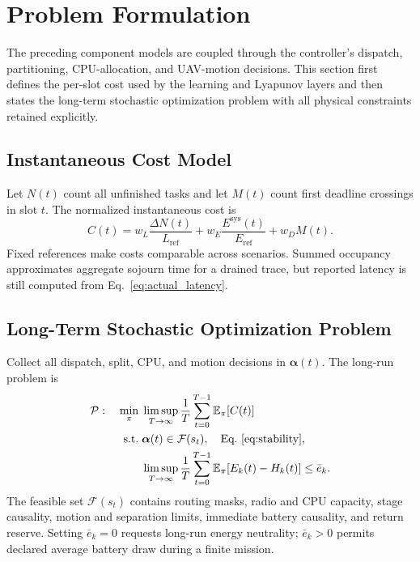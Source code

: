 \documentclass[journal]{IEEEtran}
\begin{document}
\section{Problem Formulation}
\label{problem_formulation}

The preceding component models are coupled through the controller's dispatch,
partitioning, CPU-allocation, and UAV-motion decisions.  This section first
defines the per-slot cost used by the learning and Lyapunov layers and then
states the long-term stochastic optimization problem with all physical
constraints retained explicitly.

\subsection{Instantaneous Cost Model}
Let $N(t)$ count all unfinished tasks and let $M(t)$ count first
deadline crossings in slot $t$.  The normalized instantaneous cost is
\begin{equation}
C(t)=w_L\frac{\Delta N(t)}{L_{\mathrm{ref}}}
+w_E\frac{E^{\mathrm{sys}}(t)}{E_{\mathrm{ref}}}
+w_DM(t).
\label{eq:cost}
\end{equation}
Fixed references make costs comparable across scenarios.  Summed
occupancy approximates aggregate sojourn time for a drained trace, but
reported latency is still computed from Eq.~\eqref{eq:actual_latency}.

\subsection{Long-Term Stochastic Optimization Problem}
Collect all dispatch, split, CPU, and motion decisions in
$\boldsymbol\alpha(t)$.  The long-run problem is
\begin{equation}
\begin{aligned}
\mathcal P:\quad \min_{\pi}\;&
\limsup_{T\to\infty}\frac1T
\sum_{t=0}^{T-1}\mathbb E_{\pi}[C(t)]\\
\mathrm{s.t.}\;&
\boldsymbol\alpha(t)\in\mathcal F(s_t),\quad
\text{Eq.~\eqref{eq:stability}},\\
&\limsup_{T\to\infty}\frac1T\sum_{t=0}^{T-1}
\mathbb E_{\pi}[E_k(t)-H_k(t)]\le\bar e_k .
\end{aligned}
\label{eq:problem}
\end{equation}
The feasible set $\mathcal F(s_t)$ contains routing masks, radio and
CPU capacity, stage causality, motion and separation limits, immediate
battery causality, and return reserve.  Setting $\bar e_k=0$ requests
long-run energy neutrality; $\bar e_k>0$ permits declared average
battery draw during a finite mission.
\end{document}
